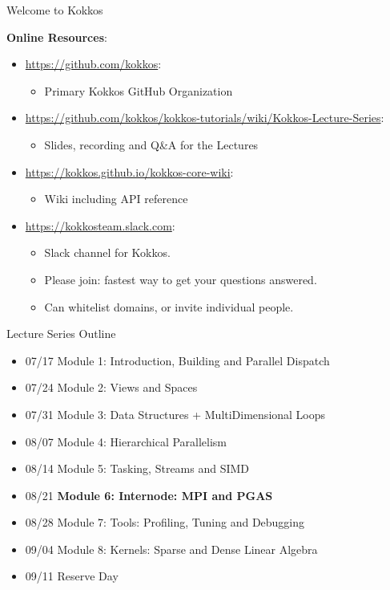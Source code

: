 \begin{frame}[fragile]{Welcome to Kokkos}

\textbf{Online Resources}:

\begin{itemize}
        \item \url{https://github.com/kokkos}:
                \begin{itemize}
                        \item Primary Kokkos GitHub Organization
                \end{itemize}
        \item \url{https://github.com/kokkos/kokkos-tutorials/wiki/Kokkos-Lecture-Series}:
                \begin{itemize}
        \item{Slides, recording and Q\&A for the Lectures}
                \end{itemize}
        \item \url{https://kokkos.github.io/kokkos-core-wiki}:
                \begin{itemize}
                        \item Wiki including API reference
                \end{itemize}
        \item \url{https://kokkosteam.slack.com}:
                \begin{itemize}
                        \item Slack channel for Kokkos.
                        \item Please join: fastest way to get your questions answered.
                        \item Can whitelist domains, or invite individual people.
                \end{itemize}
\end{itemize}

\end{frame}



\begin{frame}{Lecture Series Outline}

\begin{itemize}
        \item 07/17 Module 1: Introduction, Building and Parallel Dispatch
        \item 07/24 Module 2: Views and Spaces
        \item 07/31 Module 3: Data Structures + MultiDimensional Loops
        \item 08/07 Module 4: Hierarchical Parallelism
        \item 08/14 Module 5: Tasking, Streams and SIMD
        \item 08/21 \textbf{Module 6: Internode: MPI and PGAS}
        \item 08/28 Module 7: Tools: Profiling, Tuning and Debugging
        \item 09/04 Module 8: Kernels: Sparse and Dense Linear Algebra
        \item 09/11 Reserve Day
\end{itemize}
\end{frame}

